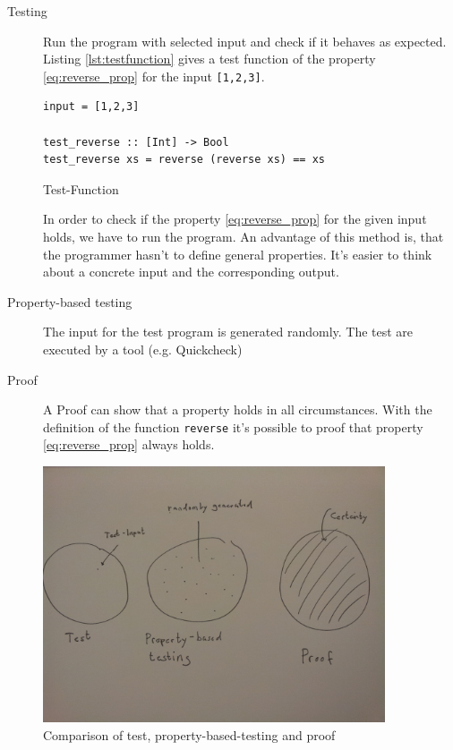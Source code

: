 \documentclass[twoside, a4paper, 12pt]{article}
\begin{document}
\begin{description}
\item[Testing] Run the program with selected input and check if it behaves as expected. Listing \ref{lst:testfunction} gives a test function of the property \ref{eq:reverse_prop} for the input \verb|[1,2,3]|.
  \label{fig:test}
\begin{program}
\begin{verbatim}
input = [1,2,3]

test_reverse :: [Int] -> Bool
test_reverse xs = reverse (reverse xs) == xs
\end{verbatim}
\caption{Test-Function}
\label{lst:testfunction}
\end{program}

In order to check if the property \ref{eq:reverse_prop} for the given input holds, we have to run the program.
 An advantage of this method is, that the programmer hasn't to define general properties. It's easier to think about a concrete input and the corresponding output.

\item[Property-based testing] The input for the test program is generated randomly. The test are executed by a tool (e.g. Quickcheck)
\item[Proof] A Proof can show that a property holds in all circumstances. With the definition of the function \verb|reverse| it's possible to proof that property \ref{eq:reverse_prop} always holds. 
\end{description}

\begin{figure}
  \centering
     \includegraphics[width=0.9\textwidth]{comp}
  \caption{Comparison of test, property-based-testing and proof}
  \label{fig:property_validation}
\end{figure}
\end{document}
